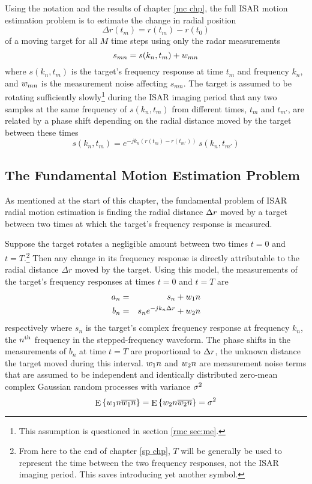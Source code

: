 Using the notation and the results of chapter \ref{mc chp}, the full ISAR
motion estimation problem is to estimate the change in radial position 
\begin{equation}
\Delta r(t_m)=r(t_m)-r(t_0)
\end{equation}
of a moving target for all $M$ time steps using only the radar measurements 
\begin{equation}
s_{mn}=s(k_n,t_m)+{w}_{mn}
\end{equation}
where $s(k_n,t_m)$ is the target's frequency response at time $t_m$ and
frequency $k_n$, and ${w}_{mn}$ is the measurement noise affecting
$s_{mn}$.  The target is assumed to be rotating sufficiently
slowly\footnote{This assumption is questioned in section 
\protect\ref{rmc sec:me}.}
during the ISAR imaging period that any two samples at the same frequency
of $s(k_n,t_m)$ from different times, $t_m$ and $t_{m'}$, are related by a
phase shift depending on the radial distance moved by the target between
these times
\begin{equation}
s(k_n,t_m)=e^{-jk_n(r(t_m)-r(t_{m'}))}\,s(k_n,t_{m'})
\end{equation}

\subsection{The Fundamental Motion Estimation Problem}

As mentioned at the start of this chapter, the fundamental problem of
ISAR radial motion estimation is finding the radial distance ${\Delta r}$ moved by
a target between two times at which the target's frequency
response is measured.  

Suppose the target rotates a negligible amount between two times $t=0$ and
$t=T$.\footnote{From here to the end of chapter \protect\ref{sp chp}, $T$
will be generally be used to represent the time between the two frequency 
responses, not the ISAR imaging period.  This saves introducing yet another
symbol.} Then any change in its frequency response is directly attributable
to the radial distance $\Delta r$ moved by the target.  Using this model,
the measurements of the target's frequency responses at times $t=0$ and
$t=T$ are
\begin{eqnarray}
a_n&=&s_n+{w_1}{n}{\nonumber}\\
b_n&=&s_n{e^{-jk_n{\Delta r}}}+{w_2}{n}    
\label{ml eqn:std model}
\end{eqnarray}
respectively where $s_n$ is the target's complex frequency response at frequency
$k_n$, the $n^{\rm th}$ frequency in the stepped-frequency waveform.
The phase shifts in the measurements of $b_n$ at
time $t=T$ are proportional to ${\Delta r}$, the unknown distance the target moved
during this interval.  ${w_1}{n}$ and ${w_2}{n}$ are measurement noise terms
that are assumed to be independent and identically distributed zero-mean
complex Gaussian random processes with variance ${\sigma^2}$
\begin{equation}
{\mathop{\rm E}\nolimits\left\{{w_1}{n}\overline{{w_1}{n}}\right\}}={\mathop{\rm E}\nolimits\left\{{w_2}{n}\overline{{w_2}{n}}\right\}}={\sigma^2}
\end{equation}

